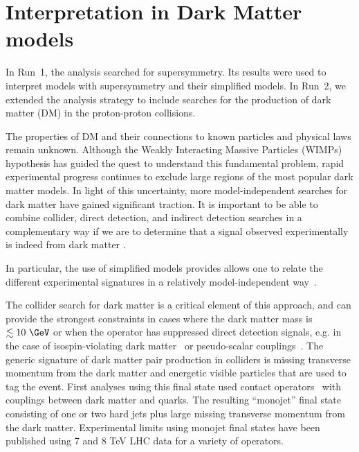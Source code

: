 \section{Interpretation in Dark Matter models}
\label{sec:darkmatter}

In Run~1, the \alphat analysis searched for supersymmetry. Its results were used to interpret models with supersymmetry and their simplified
models. In Run~2, we extended the analysis strategy to include searches for the production of dark matter (DM) in the proton-proton collisions.

The properties of DM and their connections to known particles and
physical laws remain unknown. Although the Weakly Interacting Massive
Particles (WIMPs) hypothesis has guided the quest to understand this
fundamental problem, rapid experimental progress continues to exclude
large regions of the most popular dark matter models. In light of this
uncertainty, more model-independent searches for dark matter have gained
significant traction. It is important to be able to combine collider,
direct detection, and indirect detection searches in a complementary way
if we are to determine that a signal observed experimentally is indeed
from dark matter \cite{Bauer:2013ihz}.

In particular, the use of simplified models provides allows one to relate the different experimental
signatures in a relatively model-independent way~\cite{Buchmueller:2014yoa}. 



The collider search for dark matter is a critical element of this approach, and can provide the strongest constraints in cases where the
dark matter mass is $\lesssim 10\ \GeV$ or when the operator has suppressed direct detection signals, e.g. in the case of
isospin-violating dark matter~\cite{Feng:2011vu} or pseudo-scalar couplings~\cite{Buckley:2014fba}. The generic signature of dark matter
pair production in colliders is missing transverse momentum from the  dark matter and energetic visible particles that are used to tag the
event. First analyses using this final state used contact operators~\cite{Goodman:2010ku} with couplings between dark matter and
quarks. The resulting ``monojet'' final state consisting of one or two hard jets plus large missing transverse momentum from the dark matter.
Experimental limits using monojet final states have been published using
7 and 8 TeV LHC data \cite{Chatrchyan:2012me,ATLAS:2012ky} for a variety
of operators.


